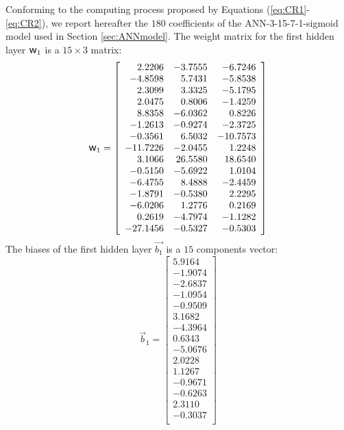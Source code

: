 \documentclass[twoside,english,1p,final,sort&compress]{elsarticle}
\theoremstyle{plain}
\DeclareRobustCommand{\w}{\mbox{\large\ensuremath{\mathsf{w}}}}
\begin{document}
Conforming to the computing process proposed by Equations (\ref{eq:CR1}-\ref{eq:CR2}), we report hereafter the $180$ coefficients of the ANN-3-15-7-1-sigmoid model used in Section \ref{sec:ANNmodel}.
The weight matrix for the first hidden layer $\w_1$ is a $15\times3$ matrix:
\begin{equation*}
\w_1 = \left[
\begin{array}{rrr}
2.2206 & -3.7555 & -6.7246\\
-4.8598 & 5.7431 & -5.8538\\
2.3099 & 3.3325 & -5.1795\\
2.0475 & 0.8006 & -1.4259\\
8.8358 & -6.0362 & 0.8226\\
-1.2613 & -0.9274 & -2.3725\\
-0.3561 & 6.5032 & -10.7573\\
-11.7226 & -2.0455 & 1.2248\\
3.1066 & 26.5580 & 18.6540\\
-0.5150 & -5.6922 & 1.0104\\
-6.4755 & 8.4888 & -2.4459\\
-1.8791 & -0.5380 & 2.2295\\
-6.0206 & 1.2776 & 0.2169\\
0.2619 & -4.7974 & -1.1282\\
-27.1456 & -0.5327 & -0.5303\\
\end{array}\right]
\end{equation*}
The biases of the first hidden layer $\overrightarrow{b_1}$ is a $15$ components vector:
\begin{equation*}
\overrightarrow{b}_1 = \left[
\begin{array}{r}
5.9164\\
-1.9074\\
-2.6837\\
-1.0954\\
-0.9509\\
3.1682\\
-4.3964\\
0.6343\\
-5.0676\\
2.0228\\
1.1267\\
-0.9671\\
-0.6263\\
2.3110\\
-0.3037\\
\end{array}\right]
\end{equation*}
\end{document}
